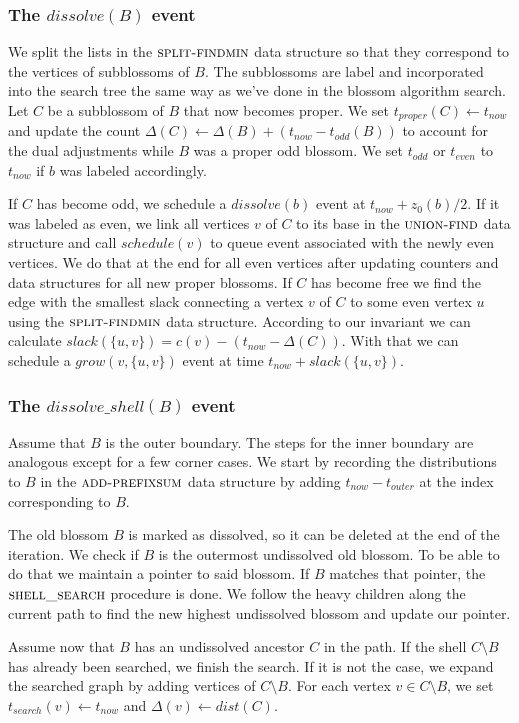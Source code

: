 \subsubsection*{The $dissolve(B)$ event} 
We split the lists in the $\textsc{split-findmin}$ data structure so that they correspond to the vertices of subblossoms of $B$. The subblossoms are label and incorporated into the search tree the same way as we've done in the blossom algorithm search. Let $C$ be a subblossom of $B$ that now becomes proper. We set $t_{proper}(C) \gets t_{now}$ and update the count $\Delta(C) \gets \Delta(B) + (t_{now} - t_{odd}(B))$ to account for the dual adjustments while $B$ was a proper odd blossom. We set $t_{odd}$ or $t_{even}$ to $t_{now}$ if $b$ was labeled accordingly. 

If $C$ has become odd, we schedule a $dissolve(b)$ event at $t_{now} + z_0(b) / 2$. If it was labeled as even, we link all vertices $v$ of $C$ to its base in the $\textsc{union-find}$ data structure and call $schedule(v)$ to queue event associated with the newly even vertices. We do that at the end for all even vertices after updating counters and data structures for all new proper blossoms. If $C$ has become free we find the edge with the smallest slack connecting a vertex $v$ of $C$ to some even vertex $u$ using the $\textsc{split-findmin}$ data structure. According to our invariant we can calculate $slack(\{u, v\}) = c(v) - (t_{now} - \Delta(C))$. With that we can schedule a $grow(v, \{u, v\})$ event at time $t_{now} + slack(\{u, v\})$. 

\subsubsection*{The $dissolve\_shell(B)$ event}
Assume that $B$ is the outer boundary. The steps for the inner boundary are analogous except for a few corner cases. We start by recording the distributions to $B$ in the $\textsc{add-prefixsum}$ data structure by adding $t_{now} - t_{outer}$ at the index corresponding to $B$.

The old blossom $B$ is marked as dissolved, so it can be deleted at the end of the iteration. We check if $B$ is the outermost undissolved old blossom. To be able to do that we maintain a pointer to said blossom. If $B$ matches that pointer, the $\textsc{shell\_search}$ procedure is done. We follow the heavy children along the current path to find the new highest undissolved blossom and update our pointer.

Assume now that $B$ has an undissolved ancestor $C$ in the path. If the shell $C \setminus B$ has already been searched, we finish the search. If it is not the case, we expand the searched graph by adding vertices of $C \setminus B$. For each vertex $v \in C \setminus B$, we set $t_{search}(v) \gets t_{now}$ and $\Delta(v) \gets dist(C)$.

